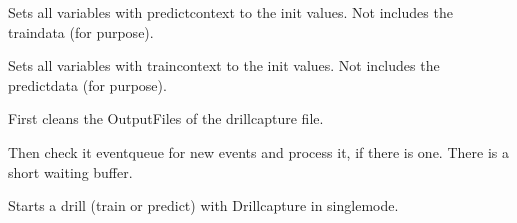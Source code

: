 \documentclass[letterpaper,10pt,english]{sphinxmanual}
\begin{document}
\begin{fulllineitems}
\begin{fulllineitems}
\label{\detokenize{anoog.automation:anoog.automation.controller.Terminal.reset_predict}}
\sphinxAtStartPar
Sets all variables with predict\sphinxhyphen{}context to the init values.
Not includes the train\sphinxhyphen{}data (for purpose).

\end{fulllineitems}


\begin{fulllineitems}
\label{\detokenize{anoog.automation:anoog.automation.controller.Terminal.reset_train}}
\sphinxAtStartPar
Sets all variables with train\sphinxhyphen{}context to the init values.
Not includes the predict\sphinxhyphen{}data (for purpose).

\end{fulllineitems}


\begin{fulllineitems}
\label{\detokenize{anoog.automation:anoog.automation.controller.Terminal.run}}
\sphinxAtStartPar
First cleans the Output\sphinxhyphen{}Files of the drillcapture file.

\sphinxAtStartPar
Then check it event\sphinxhyphen{}queue for new events and process it, if there is one.
There is a short waiting buffer.

\end{fulllineitems}


\begin{fulllineitems}
\label{\detokenize{anoog.automation:anoog.automation.controller.Terminal.start}}
\sphinxAtStartPar
Starts a drill (train or predict) with Drillcapture in single\sphinxhyphen{}mode.

\end{fulllineitems}


\end{fulllineitems}
\end{document}
